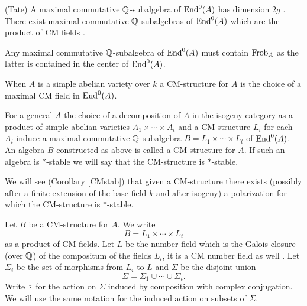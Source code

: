 \begin{theorem}
\notready(Tate)\label{tate} A maximal  commutative $\mathbb{Q}$-subalgebra of $\textnormal{End}^0(A)$ has dimension $2g$ \cite{Tate}. There exist maximal commutative $\mathbb{Q}$-subalgebras of $\textnormal{End}^0(A)$ which are the product of CM fields \cite[Lemma 2]{TateBour}.\end{theorem}
\begin{remark}
\notready\label{remfrob}
Any maximal commutative $\mathbb{Q}$-subalgebra of $\textnormal{End}^0(A)$ must contain  $\textnormal{Frob}_A$ as the latter is contained in the center of $\textnormal{End}^0(A)$.
\end{remark}
\begin{definition}
\notready\label{definitionCM}
When $A$ is a simple abelian variety over $k$ a CM-structure for $A$ is the choice of a maximal CM field in $\textnormal{End}^0(A)$.

For a general $A$ the choice of a decomposition of $A$  in the isogeny category as a product of simple abelian varieties $A_1\times \cdots\times A_t$ and a  CM-structure $L_i$ for each $A_i$ induce a maximal commutative $\mathbb{Q}$-subalgebra ${B=L_1\times \cdots\times L_t}$ of $\textnormal{End}^0(A)$. An algebra $B$  constructed as above  is called a CM-structure for $A$. If such an algebra is $*$-stable we will say that the CM-structure is $*$-stable.
\end{definition}
\begin{remark}
\notready
We will see (Corollary \ref{CMstab}) that given a CM-structure there exists (possibly after a finite extension of the base field $k$ and after isogeny) a polarization for which  the CM-structure is $*$-stable.
\end{remark}


\begin{notation}
\notready\label{NotationCM}
Let $B$ be a CM-structure for $A$. We write \[{B=L_1\times \cdots\times L_t}\] as a product of CM fields. Let
 $L$ be the number field which is the Galois closure (over $\mathbb{Q}$) of the compositum of the fields $L_i$, it is a CM number field as well \cite[Proposition 5.12]{goro}. Let $\Sigma_i$ be the set of morphisms from $L_i$ to $L$ and   $\Sigma$ be the disjoint union
 \[\Sigma = \Sigma_1\cup\cdots \cup \Sigma_t.\]
Write $\bar{\cdot}$ for the action on $\Sigma$ induced by composition with  complex conjugation. We will use the same notation for the induced action on subsets of  $\Sigma$.
\end{notation}


